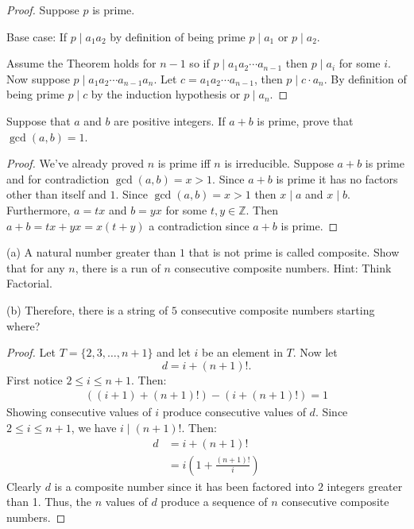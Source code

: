 \begin{proof}
    Suppose $p$ is prime.

    Base case: If $p \mid a_1 a_2$ by definition of being prime $p \mid a_1$ or $p \mid a_2$.

    Assume the Theorem holds for $n - 1$ so if $p \mid a_1 a_2 \cdots a_{n - 1}$ then $p \mid a_i$
    for some $i$. Now suppose $p \mid a_1 a_2 \cdots a_{n - 1} a_n$. Let $c = a_1 a_2 \cdots a_{n - 1}$,
    then $p \mid c \cdot a_n$. By definition of being prime $p \mid c$ by the induction hypothesis or $p \mid a_n$.
\end{proof}

\begin{tcolorbox}[title=Problem 6, breakable]
    Suppose that $a$ and $b$ are positive integers.
    If $a + b$ is prime, prove that $\gcd(a, b) = 1$.
\end{tcolorbox}

\begin{proof}
    We've already proved $n$ is prime iff $n$ is irreducible.
    Suppose $a + b$ is prime and for contradiction $\gcd(a, b) = x > 1$.
    Since $a + b$ is prime it has no factors other than itself and $1$.
    Since $\gcd(a, b) = x > 1$ then $x \mid a $ and $x \mid b$.
    Furthermore, $a = tx$ and $b = yx$ for some $t, y \in \mathbb{Z}$.
    Then $a + b = tx + yx = x(t + y)$ a contradiction since $a + b$ is prime.
\end{proof}

\begin{tcolorbox}[title=Problem 7, breakable]
    (a) A natural number greater than $1$ that is not prime 
    is called composite. Show that for any $n$, there is a run 
    of $n$ consecutive composite numbers. Hint: Think Factorial.
    
    (b) Therefore, there is a string of $5$ consecutive composite numbers 
        starting where?
\end{tcolorbox}

\begin{proof}
    Let $T = \{2, 3, \ldots, n + 1\}$ and let $i$ be an element in $T$.
    Now let 
    \[
        d = i + (n+1)!.
    \]
    First notice $2 \le i \le n + 1$. Then:
    \begin{align*}
        ((i + 1) + (n+1)!) - (i + (n+1)!) = 1
    \end{align*}
    Showing consecutive values of $i$ produce consecutive values of $d$. 
    Since $2 \le i \le n+1$, we have $i \mid (n+1)!$.
    Then:
    \begin{align*}
        d &= i + (n+1)! \\
          &= i \left( 1 + \frac{(n+1)!}{i} \right)
    \end{align*}
    Clearly $d$ is a composite number since it has been factored into $2$ integers greater than 1.
    Thus, the $n$ values of $d$ produce a sequence of $n$ consecutive composite numbers.
\end{proof}

